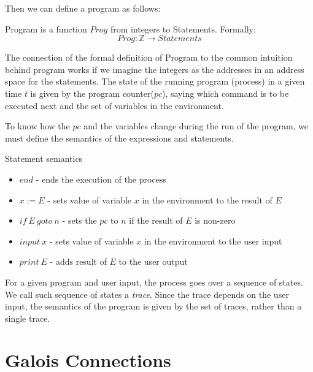 Then we can define a program as follows:

\begin{defn}[Program]
    Program is a function $Prog$ from integers to Statements.
    Formally:
    \[Prog: \mathbb{Z} \rightarrow Statements\]
\end{defn}

The connection of the formal definition of Program to the common intuition behind program works if we imagine the
integers as the addresses in an address space for the statements. %
The state of the running program (process) in a given time $t$ is given by the program counter($pc$), saying which
command is to be executed next and the set of variables in the environment.

To know how the $pc$ and the variables change during the run of the program, we must define the semantics of the
expressions and statements.

\begin{defn}
\end{defn}

\begin{defn} Statement semantics
    \begin{itemize}
        \item $end$ - ends the execution of the process
        \item $x := E$ - sets value of variable $x$ in the environment to the result of $E$
        \item $if \: E \: goto \: n$ - sets the $pc$ to $n$ if the result of $E$ is non-zero
        \item $input \: x$ - sets value of variable $x$ in the environment to the user input
        \item $print \: E$ - adds result of $E$ to the user output
    \end{itemize}
\end{defn}

For a given program and user input, the process goes over a sequence of states.
We call such sequence of states a \textit{trace}.
Since the trace depends on the user input, the semantics of the program is given by the set of traces, rather than
a single trace.



\section{Galois Connections} %

